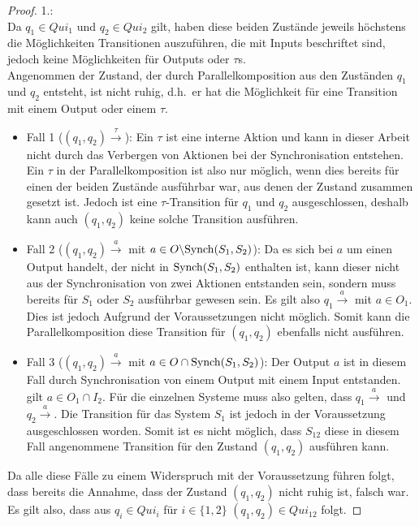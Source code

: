 \begin{proof}
  1.:\\
  Da $q_1\in Qui_1$ und $q_2\in Qui_2$ gilt, haben
  diese beiden Zustände jeweils höchstens die Möglichkeiten Transitionen
  auszuführen, die mit Inputs beschriftet sind, jedoch keine Möglichkeiten für
  Outputs oder $\tau$s.\\
  Angenommen der Zustand, der durch Parallelkomposition aus den Zuständen $q_1$
  und $q_2$ entsteht, ist nicht ruhig, d.h.\ er hat die Möglichkeit für eine
  Transition mit einem Output oder einem $\tau$.
  \begin{itemize}
    \item Fall 1 \big($(q_1,q_2) \overset{\tau}{\rightarrow}$\big): Ein $\tau$ ist eine
      interne Aktion und kann in dieser Arbeit nicht durch das Verbergen von
      Aktionen bei der Synchronisation entstehen. Ein $\tau$ in der
      Parallelkomposition ist also nur möglich, wenn dies bereits für einen der
      beiden Zustände ausführbar war, aus denen der Zustand zusammen gesetzt
      ist. Jedoch ist eine $\tau$-Transition für $q_1$ und $q_2$
      ausgeschlossen, deshalb kann auch $(q_1,q_2)$ keine solche Transition
      ausführen.
    \item Fall 2 \big($(q_1,q_2) \overset{a}{\rightarrow}$ mit $a\in O\backslash
      \mathrm{Synch}(S_1,S_2)$\big): Da es sich bei $a$ um einen Output handelt, der nicht
      in $\mathrm{Synch}(S_1,S_2)$ enthalten ist, kann dieser nicht aus der
      Synchronisation von zwei Aktionen entstanden sein, sondern muss bereits
      für $S_1$ oder $S_2$ ausführbar gewesen sein. Es gilt also \oBdA{} $q_1
      \overset{a}{\rightarrow}$ mit $a\in O_1$. Dies ist jedoch Aufgrund der
      Voraussetzungen nicht möglich. Somit kann die Parallelkomposition
      diese Transition für $(q_1,q_2)$ ebenfalls nicht ausführen.
    \item Fall 3 \big($(q_1,q_2) \overset{a}{\rightarrow}$ mit $a\in O\cap
      \mathrm{Synch}(S_1,S_2)$\big): Der Output $a$ ist in diesem Fall durch Synchronisation
      von einem Output mit einem Input entstanden. \OBdA{} gilt $a\in O_1\cap
      I_2$. Für die einzelnen Systeme muss also gelten, dass $q_1
      \overset{a}{\rightarrow}$ und $q_2 \overset{a}{\rightarrow}$. Die
      Transition für das System $S_1$ ist jedoch in der Voraussetzung
      ausgeschlossen worden. Somit ist es nicht möglich, dass $S_{12}$ diese
      in diesem Fall angenommene Transition für den Zustand $(q_1,q_2)$
      ausführen kann.
  \end{itemize}
  Da alle diese Fälle zu einem Widerspruch mit der Voraussetzung führen folgt,
  dass bereits die Annahme, dass der Zustand $(q_1,q_2)$ nicht ruhig ist,
  falsch war. Es gilt also, dass aus $q_i\in Qui_i$ für $i\in\{1,2\}$
  $(q_1,q_2)\in Qui_{12}$ folgt.


\end{proof}
